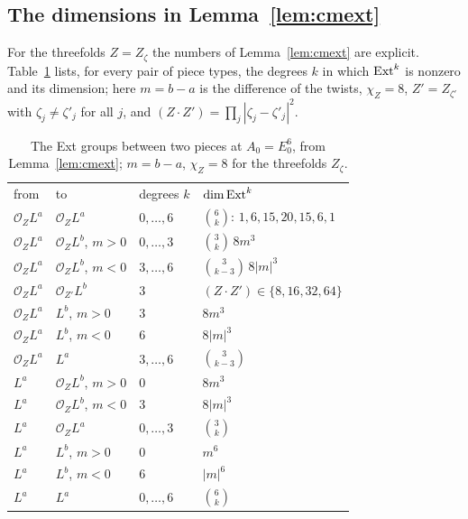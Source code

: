 \subsection{The dimensions in Lemma~\ref{lem:cmext}}\label{app:extdims}

For the threefolds $Z=Z_{\zeta}$ the numbers of Lemma~\ref{lem:cmext} are explicit. Table~\ref{tab:cmext} lists, for every pair of piece types, the degrees $k$ in which $\mathrm{Ext}^{k}$ is nonzero and its dimension; here $m=b-a$ is the difference of the twists, $\chi_{Z}=8$, $Z'=Z_{\zeta'}$ with $\zeta_{j}\ne\zeta'_{j}$ for all $j$, and $(Z\cdot Z')=\prod_{j}|\zeta_{j}-\zeta'_{j}|^{2}$.

\begin{table}[t]
\centering
\caption{The Ext groups between two pieces at $A_{0}=E_{0}^{6}$, from Lemma~\ref{lem:cmext}; $m=b-a$, $\chi_{Z}=8$ for the threefolds $Z_{\zeta}$.}
\label{tab:cmext}
\begin{ruledtabular}
\begin{tabular}{llll}
from & to & degrees $k$ & $\dim\mathrm{Ext}^{k}$ \\
\colrule
$\mathcal{O}_{Z}L^{a}$ & $\mathcal{O}_{Z}L^{a}$ & $0,\dots,6$ & $\binom{6}{k}$: $1,6,15,20,15,6,1$ \\
$\mathcal{O}_{Z}L^{a}$ & $\mathcal{O}_{Z}L^{b}$, $m>0$ & $0,\dots,3$ & $\binom{3}{k}\,8m^{3}$ \\
$\mathcal{O}_{Z}L^{a}$ & $\mathcal{O}_{Z}L^{b}$, $m<0$ & $3,\dots,6$ & $\binom{3}{k-3}\,8|m|^{3}$ \\
$\mathcal{O}_{Z}L^{a}$ & $\mathcal{O}_{Z'}L^{b}$ & $3$ & $(Z\cdot Z')\in\{8,16,32,64\}$ \\
$\mathcal{O}_{Z}L^{a}$ & $L^{b}$, $m>0$ & $3$ & $8m^{3}$ \\
$\mathcal{O}_{Z}L^{a}$ & $L^{b}$, $m<0$ & $6$ & $8|m|^{3}$ \\
$\mathcal{O}_{Z}L^{a}$ & $L^{a}$ & $3,\dots,6$ & $\binom{3}{k-3}$ \\
$L^{a}$ & $\mathcal{O}_{Z}L^{b}$, $m>0$ & $0$ & $8m^{3}$ \\
$L^{a}$ & $\mathcal{O}_{Z}L^{b}$, $m<0$ & $3$ & $8|m|^{3}$ \\
$L^{a}$ & $\mathcal{O}_{Z}L^{a}$ & $0,\dots,3$ & $\binom{3}{k}$ \\
$L^{a}$ & $L^{b}$, $m>0$ & $0$ & $m^{6}$ \\
$L^{a}$ & $L^{b}$, $m<0$ & $6$ & $|m|^{6}$ \\
$L^{a}$ & $L^{a}$ & $0,\dots,6$ & $\binom{6}{k}$ \\
\end{tabular}
\end{ruledtabular}
\end{table}

